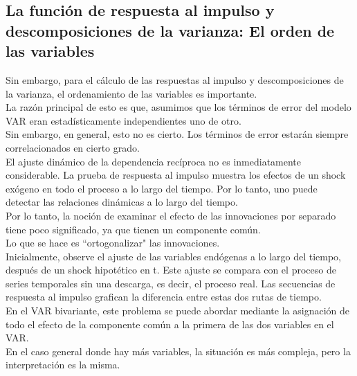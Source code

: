\subsection{La funci\'on de respuesta al impulso y descomposiciones de la varianza: El orden de las variables}
	Sin embargo, para el c\'alculo de las respuestas al impulso y descomposiciones de la varianza, el ordenamiento de las variables es importante.\\
	La raz\'on principal de esto es que, asumimos que los t\'erminos de error del modelo VAR eran estad\'{i}sticamente independientes uno de otro.\\
	Sin embargo, en general, esto no es cierto. Los t\'erminos de error estar\'an siempre correlacionados en cierto grado.\\
	El ajuste din\'amico de la dependencia rec\'{i}proca no es inmediatamente considerable. La prueba de respuesta al impulso muestra los efectos de un shock ex\'ogeno en todo el proceso a lo largo del tiempo. Por lo tanto, uno puede detectar las relaciones din\'amicas a lo largo del tiempo.\\
	
%	
	Por lo tanto, la noci\'on de examinar el efecto de las innovaciones por separado tiene poco significado, ya que tienen un componente com\'un.\\
	Lo que se hace es ``ortogonalizar" las innovaciones.\\
	Inicialmente, observe el ajuste de las variables end\'ogenas a lo largo del tiempo, despu\'es de un shock hipot\'etico en t. Este ajuste se compara con el proceso de series temporales sin una descarga, es decir, el proceso real. Las secuencias de respuesta al impulso grafican la diferencia entre estas dos rutas de tiempo.\\
	En el VAR bivariante, este problema se puede abordar mediante la asignaci\'on de todo el efecto de la componente com\'un a la primera de las dos variables en el VAR.\\
	En el caso general donde hay m\'as variables, la situación es m\'as compleja, pero la interpretaci\'on es la misma.
	
